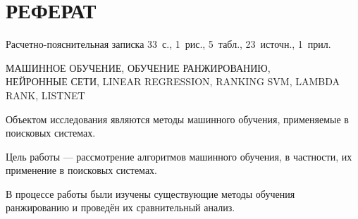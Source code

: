\chapter*{РЕФЕРАТ}

Расчетно-пояснительная записка 33~с., 1~рис., 5~табл., 23~источн., 1~прил.

\noindent\MakeUppercase{машинное обучение, обучение ранжированию,\\нейронные сети, linear regression, ranking svm, lambda rank, listnet}

Объектом исследования являются методы машинного обучения, применяемые в поисковых системах.

Цель работы --- рассмотрение алгоритмов машинного обучения, в частности, их применение в поисковых системах.

В процессе работы были изучены существующие методы обучения ранжированию и проведён их сравнительный анализ.

\setcounter{page}{3}